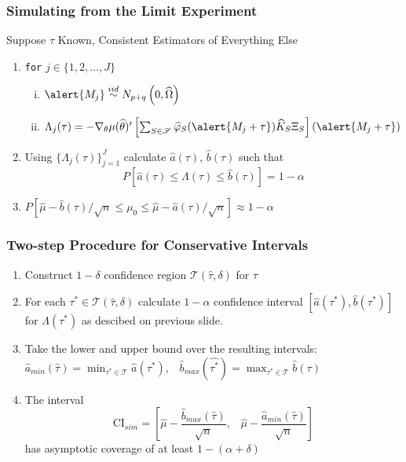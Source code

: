 
\begin{frame}
	\frametitle{Simulating from the Limit Experiment}
	
\begin{block}{Suppose $\tau$ Known, Consistent Estimators of Everything Else}
	\begin{enumerate}
	\item \texttt{for}  $j \in \{1, 2, \hdots, J\}$
		\begin{enumerate}[(i)]
			\item $\alert{M_j} \overset{iid}{\sim} N_{p+q}\left( 0, \widehat{\Omega}  \right)$
			\item $\Lambda_j(\tau) = -\nabla_\theta\mu(\widehat{\theta})'\left[\sum_{S \in \mathscr{S}} \widehat{\varphi}_S(\alert{M_j +\tau}) \widehat{K}_S \Xi_S\right](\alert{M_j +\tau})$	
		\end{enumerate}
				\item Using $\{\Lambda_j(\tau)\}_{j=1}^J$ calculate $\widehat{a}(\tau)$, $\widehat{b}(\tau)$ such that
	$$P\left[ \widehat{a}(\tau) \leq\Lambda(\tau)\leq \widehat{b}(\tau) \right] = 1 - \alpha$$
	\item $P\left[ \widehat{\mu} - \widehat{b}(\tau)/\sqrt{n}\leq  \mu_0 \leq \widehat{\mu} - \widehat{a}(\tau)/\sqrt{n}\right] \approx 1-\alpha$
	\end{enumerate}
\end{block}

\end{frame}


\begin{frame}
	\frametitle{Two-step Procedure for Conservative Intervals}

	\begin{enumerate}
		\item Construct $1-\delta$ confidence region $\mathscr{T}(\widehat{\tau}, \delta)$ for $\tau$ 
		\item For each $\tau^* \in \mathscr{T}(\widehat{\tau},\delta)$ calculate $1-\alpha$ confidence interval $\left[\widehat{a}(\tau^*),\widehat{b}(\tau^*)\right]$ for $\Lambda(\tau^*)$ as descibed on previous slide.
		\item Take the lower and upper bound over the resulting intervals:
			$\widehat{a}_{min}(\widehat{\tau})= \min_{\tau^* \in \mathscr{T}} \widehat{a}(\tau^*), \;\;\; 				\widehat{b}_{max}(\widehat{\tau^*})= \max_{\tau^* \in \mathscr{T}} \widehat{b}(\tau)$
		\item The interval
				$$\mbox{CI}_{sim}=\left[ \widehat{\mu} - \frac{\widehat{b}_{max}(\widehat{\tau})}{\sqrt{n}}, \;\;\; \widehat{\mu} - \frac{\widehat{a}_{min}(\widehat{\tau})}{\sqrt{n}} \right]$$
		\alert{has asymptotic coverage of at least $1-(\alpha + \delta)$}
	\end{enumerate}



\end{frame}

